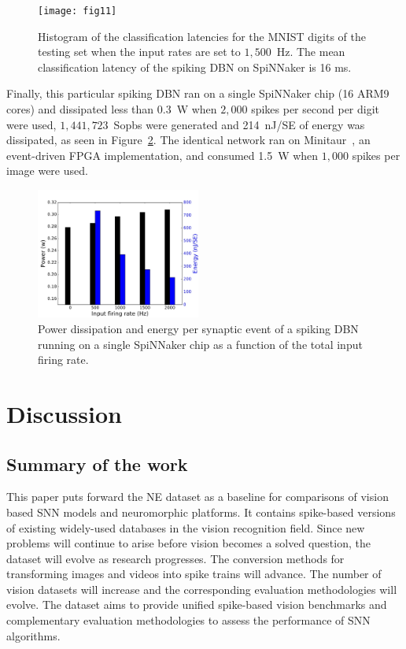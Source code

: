 \documentclass{frontiersENG} %
\begin{document}
\begin{figure}[hbt!]
	\centering
	\texttt{[image: fig11]}
	\caption{Histogram of the classification latencies for the MNIST digits of the testing set when the input rates are set to $1,500$~Hz. The mean classification latency of the spiking DBN on SpiNNaker is 16 ms.}
	\label{Fig:spinnLatency1500hz}
\end{figure} 

Finally, this particular spiking DBN ran on a single SpiNNaker chip (16 ARM9 cores) and dissipated less than 0.3~W when $2,000$ spikes per second per digit were used, $1,441,723$~Sopbs were generated and 214~nJ/SE of energy was dissipated, as seen in Figure~\ref{Fig:spinnchipPower}. The identical network ran on Minitaur~\citep{neil2014minitaur}, an event-driven FPGA implementation, and consumed 1.5~W when $1,000$ spikes per image were used.  


\begin{figure}[hbt!]
	\centering
	\includegraphics[width=0.48\textwidth]{fig12}
	\caption{Power dissipation and energy per synaptic event of a spiking DBN running on a single SpiNNaker chip as a function of the total input firing rate.}
	\label{Fig:spinnchipPower}
\end{figure} 

\section{Discussion}
\label{sec:summ}
\subsection{Summary of the work}
This paper puts forward the NE dataset as a baseline for comparisons of vision based SNN models and neuromorphic platforms.
It contains spike-based versions of existing widely-used databases in the vision recognition field.
Since new problems will continue to arise before vision becomes a solved question, the dataset will evolve as research progresses. 
The conversion methods for transforming images and videos into spike trains will advance. The number of vision datasets will increase and the corresponding evaluation methodologies will evolve.
The dataset aims to provide unified spike-based vision benchmarks and complementary evaluation methodologies to assess the performance of SNN algorithms.
\end{document}
